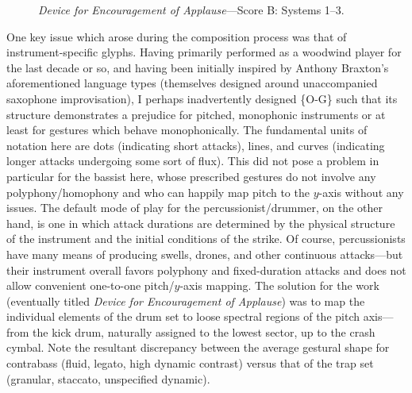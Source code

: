     \begin{figure}
        \centering
        \captionsetup{width=.5\textwidth}
        \caption{\textit{Device for Encouragement of Applause}---Score B: Systems 1--3.}
        \label{fig:encouragementB}
    \end{figure}

    One key issue which arose during the composition process was that of instrument-specific glyphs. Having primarily performed as a woodwind player for the last decade or so, and having been initially inspired by Anthony Braxton's aforementioned language types (themselves designed around unaccompanied saxophone improvisation), I perhaps inadvertently designed \{O-G\} such that its structure demonstrates a prejudice for pitched, monophonic instruments or at least for gestures which behave monophonically. The fundamental units of notation here are dots (indicating short attacks), lines, and curves (indicating longer attacks undergoing some sort of flux). This did not pose a problem in particular for the bassist here, whose prescribed gestures do not involve any polyphony/homophony and who can happily map pitch to the $y$-axis without any issues. The default mode of play for the percussionist/drummer, on the other hand, is one in which attack durations are determined by the physical structure of the instrument and the initial conditions of the strike. Of course, percussionists have many means of producing swells, drones, and other continuous attacks---but their instrument overall favors polyphony and fixed-duration attacks and does not allow convenient one-to-one pitch/$y$-axis mapping. The solution for the work (eventually titled \textit{Device for Encouragement of Applause}) was to map the individual elements of the drum set to loose spectral regions of the pitch axis---from the kick drum, naturally assigned to the lowest sector, up to the crash cymbal. Note the resultant discrepancy between the average gestural shape for contrabass (fluid, legato, high dynamic contrast) versus that of the trap set (granular, staccato, unspecified dynamic). 
    
